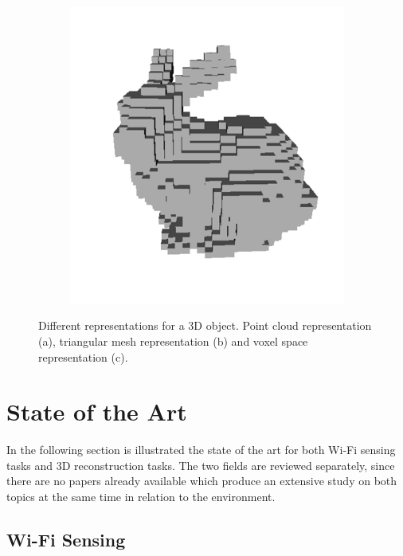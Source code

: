 \documentclass[binding=0.6cm,noexaminfo]{sapthesis}
\begin{document}
\begin{figure}[h!]
\begin{subfigure}{.32\textwidth}
	\caption{}
\end{subfigure}
\begin{subfigure}{.32\textwidth}
	\centering
	\includegraphics[width=\linewidth]{bunny-voxel}
	\caption{}
\end{subfigure}
\caption{Different representations for a 3D object. Point cloud representation (a), triangular mesh representation (b) and voxel space representation (c).}
\label{fig:3d-repr}
\end{figure}

\section{State of the Art}\label{sec:sota}
In the following section is illustrated the state of the art for both Wi-Fi sensing tasks and 3D reconstruction tasks. The two fields are reviewed separately, since there are no papers already available which produce an extensive study on both topics at the same time in relation to the environment.

\subsection{Wi-Fi Sensing}
\end{document}
